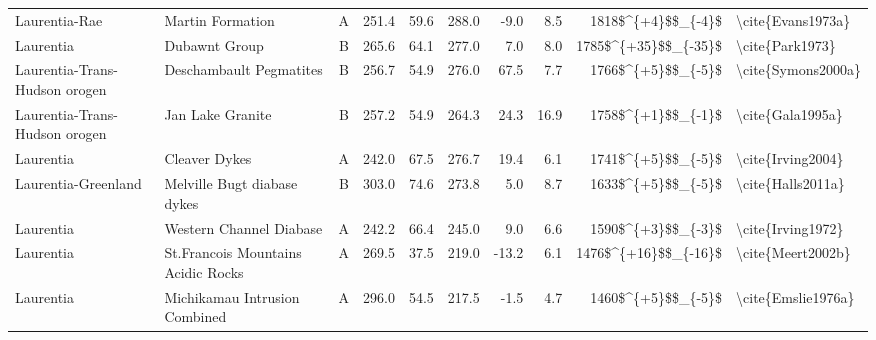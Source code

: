 \begin{longtable}{p{1 in}p{1 in}rrrrrrr}
                 Laurentia-Rae &                                   Martin Formation &      A &     251.4 &      59.6 & 288.0 &  -9.0 &       8.5 &     1818\$\textasciicircum \{+4\}\$\$\_\{-4\}\$ &                                  \textbackslash cite\{Evans1973a\} \\
                     Laurentia &                                      Dubawnt Group &      B &     265.6 &      64.1 & 277.0 &   7.0 &       8.0 &   1785\$\textasciicircum \{+35\}\$\$\_\{-35\}\$ &                                    \textbackslash cite\{Park1973\} \\
 Laurentia-Trans-Hudson orogen &                            Deschambault Pegmatites &      B &     256.7 &      54.9 & 276.0 &  67.5 &       7.7 &     1766\$\textasciicircum \{+5\}\$\$\_\{-5\}\$ &                                 \textbackslash cite\{Symons2000a\} \\
 Laurentia-Trans-Hudson orogen &                                   Jan Lake Granite &      B &     257.2 &      54.9 & 264.3 &  24.3 &      16.9 &     1758\$\textasciicircum \{+1\}\$\$\_\{-1\}\$ &                                   \textbackslash cite\{Gala1995a\} \\
                     Laurentia &                                      Cleaver Dykes &      A &     242.0 &      67.5 & 276.7 &  19.4 &       6.1 &     1741\$\textasciicircum \{+5\}\$\$\_\{-5\}\$ &                                  \textbackslash cite\{Irving2004\} \\
           Laurentia-Greenland &                        Melville Bugt diabase dykes &      B &     303.0 &      74.6 & 273.8 &   5.0 &       8.7 &     1633\$\textasciicircum \{+5\}\$\$\_\{-5\}\$ &                                  \textbackslash cite\{Halls2011a\} \\
                     Laurentia &                            Western Channel Diabase &      A &     242.2 &      66.4 & 245.0 &   9.0 &       6.6 &     1590\$\textasciicircum \{+3\}\$\$\_\{-3\}\$ &                                  \textbackslash cite\{Irving1972\} \\
                     Laurentia &                 St.Francois Mountains Acidic Rocks &      A &     269.5 &      37.5 & 219.0 & -13.2 &       6.1 &   1476\$\textasciicircum \{+16\}\$\$\_\{-16\}\$ &                                  \textbackslash cite\{Meert2002b\} \\
                     Laurentia &                      Michikamau Intrusion Combined &      A &     296.0 &      54.5 & 217.5 &  -1.5 &       4.7 &     1460\$\textasciicircum \{+5\}\$\$\_\{-5\}\$ &                                 \textbackslash cite\{Emslie1976a\} \\

\end{longtable}
